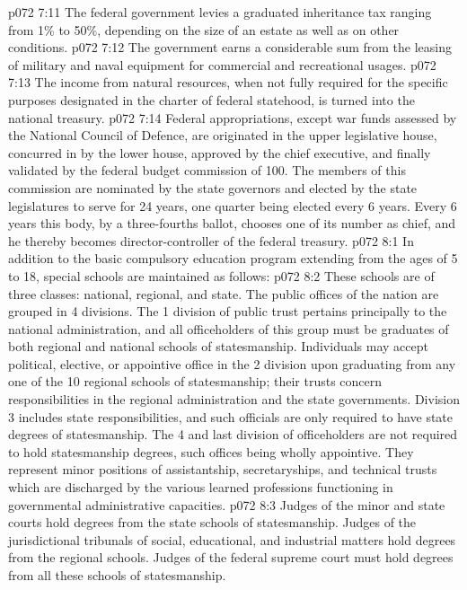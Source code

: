 \vs p072 7:11 \bibnobreakspace {} The federal government levies a graduated inheritance tax ranging from 1\% to 50\%, depending on the size of an estate as well as on other conditions.
\vs p072 7:12 \bibnobreakspace {} The government earns a considerable sum from the leasing of military and naval equipment for commercial and recreational usages.
\vs p072 7:13 \bibnobreakspace {} The income from natural resources, when not fully required for the specific purposes designated in the charter of federal statehood, is turned into the national treasury.
\vs p072 7:14 \pc Federal appropriations, except war funds assessed by the National Council of Defence, are originated in the upper legislative house, concurred in by the lower house, approved by the chief executive, and finally validated by the federal budget commission of 100. The members of this commission are nominated by the state governors and elected by the state legislatures to serve for 24 years, one quarter being elected every 6 years. Every 6 years this body, by a three\hyp{}fourths ballot, chooses one of its number as chief, and he thereby becomes director\hyp{}controller of the federal treasury.
\vs p072 8:1 In addition to the basic compulsory education program extending from the ages of 5 to 18, special schools are maintained as follows:
\vs p072 8:2 \bibnobreakspace {} These schools are of three classes: national, regional, and state. The public offices of the nation are grouped in 4 divisions. The 1 division of public trust pertains principally to the national administration, and all officeholders of this group must be graduates of both regional and national schools of statesmanship. Individuals may accept political, elective, or appointive office in the 2 division upon graduating from any one of the 10 regional schools of statesmanship; their trusts concern responsibilities in the regional administration and the state governments. Division 3 includes state responsibilities, and such officials are only required to have state degrees of statesmanship. The 4 and last division of officeholders are not required to hold statesmanship degrees, such offices being wholly appointive. They represent minor positions of assistantship, secretaryships, and technical trusts which are discharged by the various learned professions functioning in governmental administrative capacities.
\vs p072 8:3 Judges of the minor and state courts hold degrees from the state schools of statesmanship. Judges of the jurisdictional tribunals of social, educational, and industrial matters hold degrees from the regional schools. Judges of the federal supreme court must hold degrees from all these schools of statesmanship.
